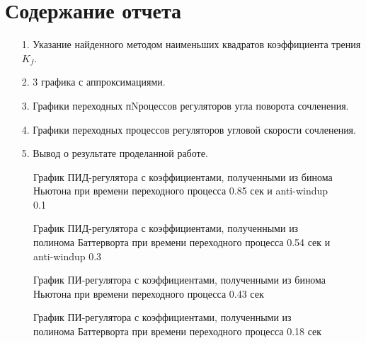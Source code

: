 \section{Содержание отчета\\}
\begin{enumerate} 
\item[1.] Указание найденного методом наименьших квадратов коэффициента трения $K_f$.
\item[2.] 3 графика с аппроксимациями.
\item[3.] Графики переходных пNроцессов регуляторов угла поворота сочленения.
\item[4.] Графики переходных процессов регуляторов угловой скорости сочленения.
\item[5.] Вывод о результате проделанной работе.
 \end{enumerate}
 
\begin{figure}[h]
	\noindent{}
	\caption{График ПИД-регулятора с коэффициентами, полученными из бинома Ньютона при времени переходного процесса 0.85 сек и anti-windup 0.1}
	\label{pidmod}
\end{figure}

\begin{figure}[h]
	\noindent{}
	\caption{График ПИД-регулятора с коэффициентами, полученными из полинома Баттерворта при времени переходного процесса 0.54 сек и anti-windup 0.3}
	\label{pidmod2}
\end{figure}

\begin{figure}[h]
	\noindent{}
	\caption{График ПИ-регулятора с коэффициентами, полученными из бинома Ньютона при времени переходного процесса 0.43 сек }
	\label{pimod}
\end{figure}

\begin{figure}[h]
	\noindent{}
	\caption{График ПИ-регулятора с коэффициентами, полученными из полинома Баттерворта при времени переходного процесса 0.18 сек }
	\label{pimod2}
\end{figure}
